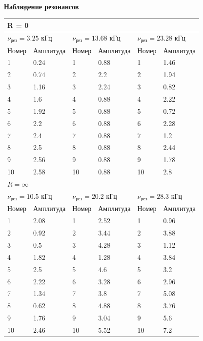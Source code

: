 \documentclass[a4paper,12 pt]{article}
\begin{document}
\textbf{Наблюдение резонансов}

\begin{table}[H]
    \centering
    \begin{tabular}{|p{2 cm}|p{2 cm}|p{2 cm}|p{2 cm}|p{2 cm}|p{2 cm}|}
    \hline
    \multicolumn{6}{|p{12 cm}|}{R = 0} \\
    \hline
    \multicolumn{2}{|p{4 cm}}{$\nu_{\text{рез}} = 3.25$ кГц}  & \multicolumn{2}{|p{4 cm}}{$\nu_{\text{рез}} = 13.68$ кГц} & \multicolumn{2}{|p{4 cm}|}{$\nu_{\text{рез}} = 23.28$ кГц}  \\
    \hline
    Номер & Амплитуда & Номер & Амплитуда & Номер & Амплитуда \\
    \hline
    1 & 0.24 & 1 & 0.88 & 1 & 1.46  \\
    \hline
    2 & 0.74   & 2 & 2.2 & 2  & 1.94  \\
    \hline
    3 & 1.16   & 3 & 2.24 & 3 & 0.82  \\
    \hline
    4 & 1.6    & 4 & 0.88 & 4 & 2.22  \\
    \hline
    5 & 1.92   & 5 & 0.88 & 5 & 0.72  \\
    \hline
    6 & 2.2    & 6 & 0.88 & 6 & 2.28  \\
    \hline
    7 & 2.4    & 7 & 0.88 & 7 & 1.2  \\
    \hline
    8 & 2.5    & 8 & 0.88 & 8 & 2.44  \\
    \hline
    9 & 2.56   & 9 & 0.88 & 9 & 1.78  \\
    \hline
    10 & 2.58 & 10 & 0.88 & 10 & 2.8  \\
    \hline
    \hline

    
    \multicolumn{6}{|p{12 cm}|}{$R = \infty$} \\
    \hline
    \multicolumn{2}{|p{4 cm}}{$\nu_{\text{рез}} = 10.5$ кГц}  & \multicolumn{2}{|p{4 cm}}{$\nu_{\text{рез}} = 20.2$ кГц} & \multicolumn{2}{|p{4 cm}|}{$\nu_{\text{рез}} = 28.3$ кГц}  \\
    \hline
    Номер & Амплитуда & Номер & Амплитуда & Номер & Амплитуда \\
    \hline
    1  &  2.08  &  1  &  2.52  &  1  &  0.96  \\
    \hline
    2  &  0.92  &  2  &  3.44  &  2  &  3.88  \\
    \hline
    3  &  0.5  &  3  &  4.28  &  3  &  1.12  \\
    \hline
    4  &  1.82  &  4  &  1.28  &  4  &  3.84  \\
    \hline
    5  &  2.5  &  5  &  4.6  &  5  &  3.2  \\
    \hline
    6  &  2.22  &  6  &  3.28  &  6  &  2.96  \\
    \hline
    7  &  1.34  &  7  &  3.8  &  7  &  5.08  \\
    \hline
    8  &  0.62  &  8  &  4.88  &  8  &  3.76  \\
    \hline
    9  &  1.76  &  9  &  3.04  &  9  &  5.6  \\
    \hline
    10  &  2.46  &  10  &  5.52  &  10  &  7.2  \\
    \hline


\end{tabular}
\end{table}
\end{document}
